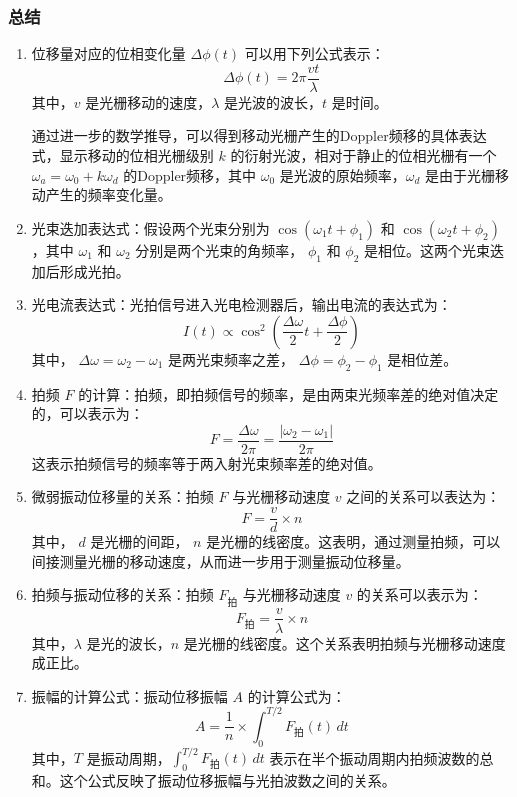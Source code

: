 \documentclass[dvipsnames, svgnames,a4paper,11pt]{article}
\begin{document}
	\subsubsection{总结}
	\begin{enumerate}
		\item 位移量对应的位相变化量 \(\Delta \phi(t)\) 可以用下列公式表示：
		\[
		\Delta \phi(t) = 2\pi \frac{vt}{\lambda}
		\]
		其中，\(v\) 是光栅移动的速度，\(\lambda\) 是光波的波长，\(t\) 是时间。
		
		通过进一步的数学推导，可以得到移动光栅产生的Doppler频移的具体表达式，显示移动的位相光栅级别 \(k\) 的衍射光波，相对于静止的位相光栅有一个 \(\omega_a=\omega_0+k\omega_d\) 的Doppler频移，其中 \(\omega_0\) 是光波的原始频率，\(\omega_d\) 是由于光栅移动产生的频率变化量。
		
		\item 光束迭加表达式：假设两个光束分别为 \( \cos(\omega_1 t + \phi_1) \) 和 \( \cos(\omega_2 t + \phi_2) \)，其中 \( \omega_1 \) 和 \( \omega_2 \) 分别是两个光束的角频率， \( \phi_1 \) 和 \( \phi_2 \) 是相位。这两个光束迭加后形成光拍。
		
		\item 光电流表达式：光拍信号进入光电检测器后，输出电流的表达式为：
		\[
		I(t) \propto \cos^2\left(\frac{\Delta \omega}{2} t + \frac{\Delta \phi}{2}\right)
		\]
		其中， \( \Delta \omega = \omega_2 - \omega_1 \) 是两光束频率之差， \( \Delta \phi = \phi_2 - \phi_1 \) 是相位差。
		
		\item 拍频 \( F \) 的计算：拍频，即拍频信号的频率，是由两束光频率差的绝对值决定的，可以表示为：
		\[
		F = \frac{\Delta \omega}{2\pi} = \frac{|\omega_2 - \omega_1|}{2\pi}
		\]
		这表示拍频信号的频率等于两入射光束频率差的绝对值。	
			
		\item 微弱振动位移量的关系：拍频 \( F \) 与光栅移动速度 \( v \) 之间的关系可以表达为：
		\[
		F = \frac{v}{d} \times n
		\]
		其中， \( d \) 是光栅的间距， \( n \) 是光栅的线密度。这表明，通过测量拍频，可以间接测量光栅的移动速度，从而进一步用于测量振动位移量。
		
		\item 拍频与振动位移的关系：拍频 \(F_{\text{拍}}\) 与光栅移动速度 \(v\) 的关系可以表示为：
		\[
		F_{\text{拍}} = \frac{v}{\lambda} \times n
		\]
		其中，\( \lambda \) 是光的波长，\( n \) 是光栅的线密度。这个关系表明拍频与光栅移动速度成正比。
		
		\item 振幅的计算公式：振动位移振幅 \(A\) 的计算公式为：
		\[
		A = \frac{1}{n} \times \int_{0}^{T/2} F_{\text{拍}}(t) \, dt
		\]
		其中，\( T \) 是振动周期，\( \int_{0}^{T/2} F_{\text{拍}}(t) \, dt \) 表示在半个振动周期内拍频波数的总和。这个公式反映了振动位移振幅与光拍波数之间的关系。	
	\end{enumerate}
	
\end{document}

